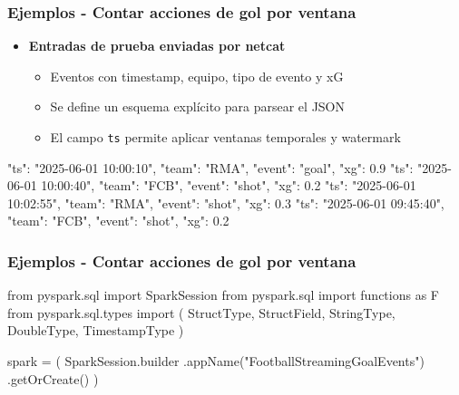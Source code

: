 \documentclass[aspectratio=169]{beamer}
\begin{document}
\begin{frame}[fragile]\frametitle{Ejemplos - Contar acciones de gol por ventana}

\begin{itemize}
	\item \textbf{Entradas de prueba enviadas por netcat}
	\begin{itemize}
		\item Eventos con timestamp, equipo, tipo de evento y xG
		\item Se define un esquema explícito para parsear el JSON
		\item El campo \texttt{ts} permite aplicar ventanas temporales y watermark
	\end{itemize}
\end{itemize}

\vspace{1em}

\begin{shellbox}
\begin{shcode}
{"ts": "2025-06-01 10:00:10", "team": "RMA", "event": "goal", "xg": 0.9}
{"ts": "2025-06-01 10:00:40", "team": "FCB", "event": "shot", "xg": 0.2}
{"ts": "2025-06-01 10:02:55", "team": "RMA", "event": "shot", "xg": 0.3}
{"ts": "2025-06-01 09:45:40", "team": "FCB", "event": "shot", "xg": 0.2}
\end{shcode}
\end{shellbox}

\end{frame}



\begin{frame}[fragile]\frametitle{Ejemplos - Contar acciones de gol por ventana}

\begin{code}
\begin{python3code}
from pyspark.sql import SparkSession
from pyspark.sql import functions as F
from pyspark.sql.types import (
    StructType, StructField,
    StringType, DoubleType, TimestampType
)

spark = (
    SparkSession.builder
    .appName("FootballStreamingGoalEvents")
    .getOrCreate()                           
)
\end{python3code}
\end{code}
\end{frame}
\end{document}

